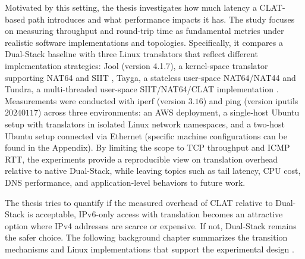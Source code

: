 Motivated by this setting, 
the thesis investigates how much latency a CLAT-based path introduces and what performance impacts it has. The study focuses on measuring throughput and round-trip time as fundamental metrics under realistic software implementations and topologies. Specifically, it compares a Dual-Stack baseline 
with three Linux translators that reflect different implementation strategies: Jool (version 4.1.7), a kernel-space translator supporting NAT64 and SIIT \cite{jool_introduction}, Tayga, a stateless user-space NAT64/NAT44 \cite{palrd_tayga_readme,Repas_Farnadi_Lencse_2014} and Tundra, a multi-threaded user-space SIIT/NAT64/CLAT implementation \cite{labuda_tundra_nat64}. Measurements were conducted with 
iperf (version $3.16$) and ping (version iputils $20240117$) across three environments: an AWS deployment, a single-host Ubuntu setup with translators in isolated Linux network namespaces, and a two-host Ubuntu setup connected via Ethernet (specific machine configurations can be found in the Appendix). By limiting the scope to TCP throughput and ICMP RTT, the experiments provide a reproducible view on translation overhead relative to native Dual-Stack, while leaving topics such as tail latency, CPU cost, DNS performance, and application-level behaviors to future work.

The thesis tries to quantify if the measured overhead of CLAT relative to Dual-Stack is acceptable, IPv6-only access with translation becomes an attractive option where IPv4 addresses are scarce or expensive. If not, Dual-Stack remains the safer choice. The following background chapter summarizes the transition mechanisms and Linux implementations that support the experimental design \cite{rfc6877, rfc4241}.



